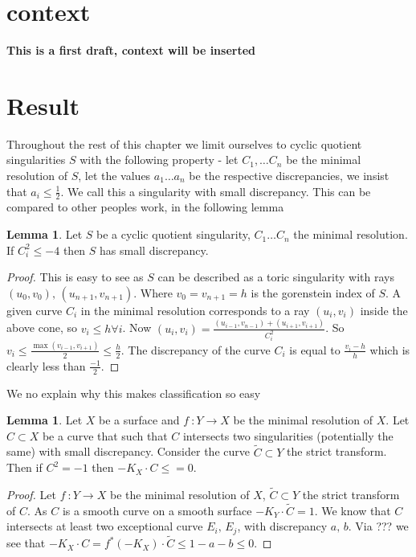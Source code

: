 \documentclass[11pt]{report}
\theoremstyle{definition}
\theoremstyle{definition}
\theoremstyle{definition}
\theoremstyle{definition}
\theoremstyle{definition}
\newtheorem{lem}[thm]{Lemma}
\theoremstyle{definition}
\theoremstyle{definition}
\theoremstyle{definition}
\begin{document}
 

\section{context}
\textbf{This is a first draft, context will be inserted}

\section{Result}

Throughout the rest of this chapter we limit ourselves to cyclic quotient singularities $S$ with the following property - let $C_1, \dots C_n$ be the minimal resolution of $S$, let the values $a_1 \dots a_n$ be the respective discrepancies, we insist that $a_i \leq \frac{1}{2}$. We call this a singularity with small discrepancy. This can be compared to other peoples work, in the following lemma
\begin{lem}
Let $S$ be a cyclic quotient singularity, $C_1 \dots C_n$ the minimal resolution. If $C_i^2 \leq -4$ then $S$ has small discrepancy.
\end{lem}
\begin{proof}
This is easy to see as $S$ can be described as a toric singularity with rays $(u_0, v_0), \, (u_{n+1},v_{n+1})$. Where $v_0 = v_{n+1} = h$ is the gorenstein index of $S$. A given curve  $C_i$ in the minimal resolution corresponds to a ray $(u_i,v_i)$ inside the above cone, so $v_i \leq h \forall i$. Now $(u_i, v_i) = \frac{(u_{i-1}, v_{n-1}) + (u_{i+1}, v_{i+1})}{C_i^2}$. So $v_i \leq \frac{\max(v_{i-1}, v_{i+1})}{2} \leq \frac{h}{2}$. The discrepancy of the curve $C_i$ is equal to $\frac{v_i-h}{h}$ which is clearly less than $\frac{-1}{2}$.
\end{proof}
We no explain why this makes classification so easy 
\begin{lem}
Let $X$ be a surface and  $f \: : Y \rightarrow X$ be the minimal resolution of $X$. Let $C \subset X$ be a curve that such that $C$ intersects two singularities (potentially the same) with small discrepancy. Consider the curve $\widetilde C \subset Y$ the strict transform. Then if $C^2 = -1$ then $-K_X \cdot C \leq = 0$.
\end{lem}
\begin{proof}
Let $f \: : Y \rightarrow X$ be the minimal resolution of $X$, $\widetilde C \subset Y$ the strict transform of $C$. As $C$ is a smooth curve on a smooth surface $-K_Y \cdot \widetilde C = 1$. We know that $C$ intersects at least two exceptional curve $E_i, \, E_j$, with discrepancy $a, \, b$. Via ??? we see that $-K_X \cdot C = f^*(-K_X) \cdot \widetilde C \leq 1 - a - b  \leq 0$. 
\end{proof}
\end{document}
